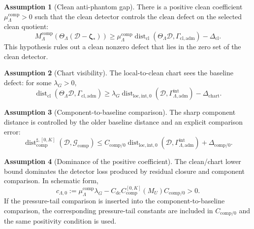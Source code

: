 \documentclass[11pt]{article}
\numberwithin{equation}{section}
\theoremstyle{definition}
\newtheorem{assumption}[assumption]{Assumption}
\theoremstyle{remark}
\newcommand{\loc}{\mathrm{loc}}
\newcommand{\intg}{\mathrm{int}}
\newcommand{\adm}{\mathrm{adm}}
\newcommand{\cl}{\mathrm{cl}}
\newcommand{\comp}{\mathrm{comp}}
\newcommand{\Dist}{\operatorname{dist}}
\newcommand{\calD}{\mathcal D}
\newcommand{\calG}{\mathcal G}
\newcommand{\bzeta}{\boldsymbol\zeta}
\begin{document}
\begin{assumption}[Clean anti-phantom gap]\label{ass:main-clean-gap}
There is a positive clean coefficient \(\mu_\Lambda^{\comp}>0\) such that the clean detector controls the clean defect on the selected clean quotient:
\begin{equation}\label{eq:ass-clean-gap}
        M_\Lambda^{\comp}(\Theta_\Lambda(\calD-\bzeta_*))
        \ge
        \mu_\Lambda^{\comp}
        \Dist_{\cl}(\Theta_\Lambda\calD,\Gamma_{\cl,\adm})
        -\Delta_{\cl}.
\end{equation}
This hypothesis rules out a clean nonzero defect that lies in the zero set of the clean detector.
\end{assumption}

\begin{assumption}[Chart visibility]\label{ass:main-chart-visibility}
The local-to-clean chart sees the baseline defect: for some \(\lambda_G>0\),
\begin{equation}\label{eq:ass-chart-visibility}
        \Dist_{\cl}(\Theta_\Lambda\calD,\Gamma_{\cl,\adm})
        \ge
        \lambda_G
        \Dist_{\loc,\intg,0}(\calD,\Gamma^{\intg}_{\Lambda,\adm})
        -\Delta_{\mathrm{chart}}.
\end{equation}
\end{assumption}

\begin{assumption}[Component-to-baseline comparison]\label{ass:main-component-baseline}
The sharp component distance is controlled by the older baseline distance and an explicit comparison error:
\begin{equation}\label{eq:ass-component-baseline}
        \Dist_{\comp}^{\sharp,[0,K]}(\calD,\calG_{\comp})
        \le
        C_{\comp/0}
        \Dist_{\loc,\intg,0}(\calD,\Gamma^{\intg}_{\Lambda,\adm})
        +
        \Delta_{\comp/0}.
\end{equation}
\end{assumption}

\begin{assumption}[Dominance of the positive coefficient]\label{ass:main-positive-coefficient}
The clean/chart lower bound dominates the detector loss produced by residual closure and component comparison.  In schematic form,
\begin{equation}\label{eq:ass-positive-coeff}
        c_{\Lambda,0}
        :=
        \mu_\Lambda^{\comp}\lambda_G
        -
        C_{\mathrm{dc}}
        C_{\comp}^{[0,K]}(M_U)
        C_{\comp/0}
        >0.
\end{equation}
If the pressure-tail comparison is inserted into the component-to-baseline comparison, the corresponding pressure-tail constants are included in \(C_{\comp/0}\) and the same positivity condition is used.
\end{assumption}
\end{document}
